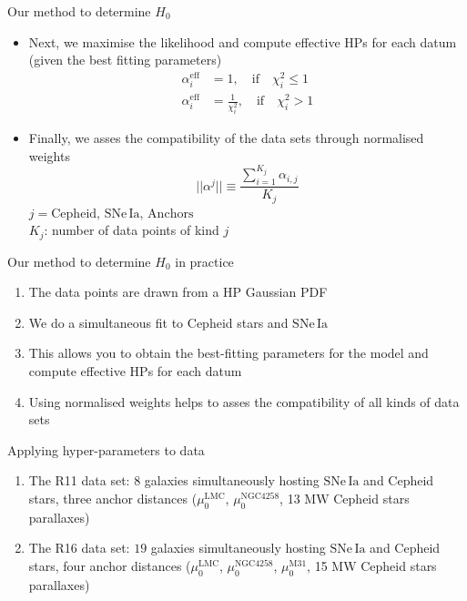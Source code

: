 \documentclass{beamer}
\newcommand{\eff}{\mathrm{eff}}
\newcommand{\LMC}{\mathrm{LMC}}
\newcommand{\MW}{\mathrm{MW}}
\newcommand{\Cepheid}{\mathrm{Cepheid}}
\newcommand{\Anchors}{\mathrm{Anchors}}
\newcommand{\SNe}{\mathrm{SNe\,Ia}}
\newcommand{\MAnd}{\mathrm{M31}}
\newcommand{\NGC}{\mathrm{NGC4258}}
\begin{document}
\begin{frame}{Our method to determine $H_0$}
\begin{itemize}
\item Next, we maximise the likelihood and compute effective HPs for each datum (given the best fitting parameters)
\begin{eqnarray*}
\alpha^{\eff}_i & = 1,\quad \mathrm{if} \quad \chi^2_i\leq1
\\
\alpha^{\eff}_i & = \frac{1}{\chi^2_i},\quad \mathrm{if} \quad \chi^2_i> 1
\end{eqnarray*}
\item Finally, we asses the compatibility of the data sets through normalised weights
\begin{equation*}
|| \alpha^{j} || \equiv \frac{\sum_{i=1}^{K_j} \alpha_{i,j}}{K_j}
\label{Eq:normalised-weights}
\end{equation*}
$j=\Cepheid,\,\SNe,\,\Anchors$\\
$K_j$: number of data points of kind $j$ 
\end{itemize}

\end{frame}

\begin{frame}{Our method to determine $H_0$ in practice}
\begin{enumerate}
\item The data points are drawn from a HP Gaussian PDF
\item We do a simultaneous fit to Cepheid stars and $\SNe$
\item This allows you to obtain the best-fitting parameters for the model and compute effective HPs for each  datum
\item Using normalised  weights helps to asses the compatibility of all kinds of data sets  
\end{enumerate}
\end{frame}

\begin{frame}{Applying hyper-parameters to data}
\begin{enumerate}
\item The R11 data set: $8$ galaxies simultaneously hosting $\SNe$ and Cepheid stars, three anchor distances ($\mu_0^\LMC$, $\mu_0^\NGC$, 13 $\MW$ Cepheid stars parallaxes)
\item The R16 data set: $19$ galaxies simultaneously hosting $\SNe$ and Cepheid stars, four anchor distances ($\mu_0^\LMC$, $\mu_0^\NGC$, $\mu_0^\MAnd$, 15 $\MW$ Cepheid stars parallaxes)
\end{enumerate}
\end{frame}
\end{document}

